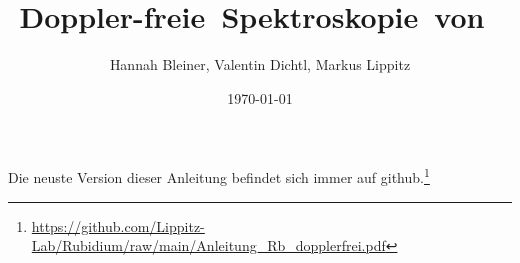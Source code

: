 \documentclass[notoc,nofonts,a4paper,twoside,nobib]{tufte-book}
\begin{document}
\sloppy
\tikzexternaldisable


\title{\hbox{Doppler-freie Spektroskopie von }}

\author{Hannah Bleiner, Valentin Dichtl, Markus Lippitz}
\date{\today}


\maketitle





\thispagestyle{show_doclicense}
\tableofcontents

\vfil
Die neuste Version dieser Anleitung befindet sich immer auf github.\footnote{\url{https://github.com/Lippitz-Lab/Rubidium/raw/main/Anleitung_Rb_dopplerfrei.pdf}} 
\newpage
\listofanswer



\newpage



\appendix




	\printbibliography
\end{document}
